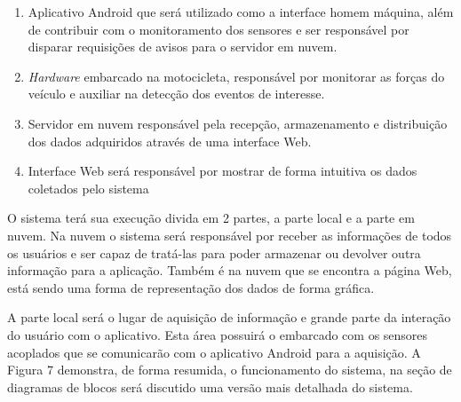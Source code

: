 \begin{enumerate}
    \item Aplicativo Android que será utilizado como a interface homem máquina,
além de contribuir com o monitoramento dos sensores e ser responsável
por disparar requisições de avisos para o servidor em nuvem.

    \item \textit{Hardware} embarcado na motocicleta, responsável por monitorar as forças do veículo e auxiliar na detecção dos eventos de interesse.
    
    \item Servidor em nuvem responsável pela recepção, armazenamento e distribuição dos dados adquiridos através de uma interface Web.
    
    \item Interface Web  será responsável por mostrar de forma intuitiva os dados coletados pelo sistema

\end{enumerate}


O sistema terá sua execução divida em 2 partes, a parte local e a parte em nuvem. Na nuvem o sistema será responsável por receber as informações de todos os usuários e ser capaz de tratá-las para poder armazenar ou devolver outra informação para a aplicação. Também é na nuvem que se encontra a página Web, está sendo uma forma de representação dos dados de forma gráfica.

A parte local será o lugar de aquisição de informação e grande parte da interação do usuário com o  aplicativo. Esta área possuirá o embarcado com os sensores acoplados que se comunicarão com o aplicativo Android para a aquisição. A Figura 7 demonstra, de forma resumida, o funcionamento do sistema, na seção de diagramas de blocos será discutido uma versão mais detalhada do sistema.


